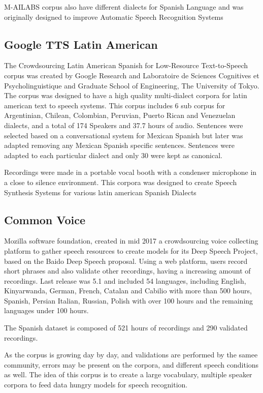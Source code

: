 \documentclass[10pt, a4paper]{article}
\begin{document}
M-AILABS corpus also have different dialects for Spanish Language and was originally designed to improve Automatic Speech Recognition Systems \cite{M-AILABS}

\subsection{Google TTS Latin American}

The Crowdsourcing Latin American Spanish for Low-Resource Text-to-Speech corpus was created by Google Research and Laboratoire de Sciences Cognitives et Psycholinguistique and Graduate School of Engineering, The University of Tokyo. The corpus was designed to have a high quality multi-dialect corpora for latin american text to speech systems. This corpus includes 6 sub corpus for Argentinian, Chilean, Colombian, Peruvian, Puerto Rican and Venezuelan dialects, and a total of 174 Speakers and 37.7 hours of audio. Sentences were selected based on a conversational system for Mexican Spanish but later was adapted removing any Mexican Spanish specific sentences. Sentences were adapted to each particular dialect and only 30 were kept as canonical.

Recordings were made in a portable vocal booth with a condenser microphone in a close to silence environment. This corpora was designed to create Speech Synthesis Systems for various latin american Spanish Dialects \cite{googleTTSLatinAmericanSpanishCorpus}



\subsection{Common Voice}

Mozilla software foundation, created in mid 2017 a crowdsourcing voice collecting platform to gather speech resources to create models for its Deep Speech Project, based on the Baido Deep Speech \cite{deepspeeh} proposal. Using a web platform, users record short phrases and also validate other recordings, having a increasing amount of recordings. Last release was 5.1 and included  54 languages, including English, Kinyarwanda, German, French, Catalan and Cabilio with more than 500 hours, Spanish, Persian Italian, Russian, Polish with over 100 hours and the remaining languages under 100 hours.

The Spanish dataset is composed of 521 hours of recordings and 290 validated recordings.

As the corpus is growing day by day, and validations are performed by the samee community, errors may be present on the corpora, and different speech conditions as well. The idea of this corpus is to create a large vocabulary, multiple speaker corpora to feed data hungry models for speech recognition.
\end{document}
